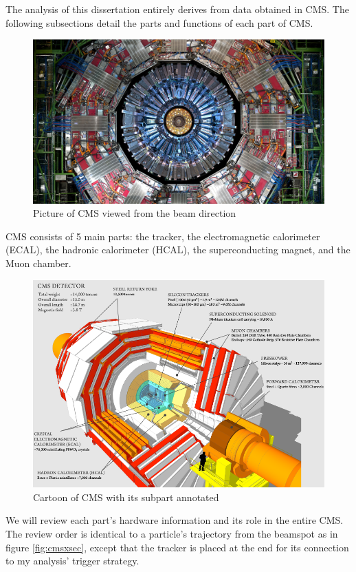 The analysis of this dissertation entirely derives from data obtained in CMS.
The following subsections detail the parts and functions of each part of CMS.
\begin{figure}[h!]
  \label{fig:cms}
  \centering
  \includegraphics[width=1.0\linewidth]{figs/cms.png}
	\caption{Picture of CMS viewed from the beam direction \cite{det}}
\end{figure}
CMS consists of 5 main parts: the tracker, the electromagnetic calorimeter (ECAL), the hadronic calorimeter (HCAL), the superconducting magnet, and the Muon chamber.
\begin{figure}[h!]
  \label{fig:CMS}
  \centering
  \includegraphics[width=0.87\linewidth]{figs/CMS.png}
	\caption{Cartoon of CMS with its subpart annotated \cite{xsec}}
\end{figure}
We will review each part's hardware information and its role in the entire CMS.
The review order is identical to a particle's trajectory from the beamspot as in figure \ref{fig:cmsxsec}, except that the tracker is placed at the end for its connection to my analysis' trigger strategy.

